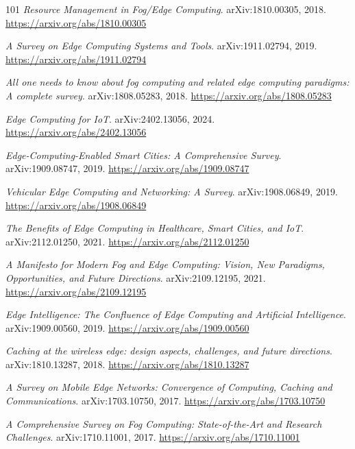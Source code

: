 \documentclass[11pt,a4paper]{article}
\begin{document}
\begin{thebibliography}{101}
\newblock \emph{Resource Management in Fog/Edge Computing}.
\newblock arXiv:1810.00305, 2018.
\newblock \url{https://arxiv.org/abs/1810.00305}

\newblock \emph{A Survey on Edge Computing Systems and Tools}.
\newblock arXiv:1911.02794, 2019.
\newblock \url{https://arxiv.org/abs/1911.02794}

\newblock \emph{All one needs to know about fog computing and related edge computing paradigms: A complete survey}.
\newblock arXiv:1808.05283, 2018.
\newblock \url{https://arxiv.org/abs/1808.05283}

\newblock \emph{Edge Computing for IoT}.
\newblock arXiv:2402.13056, 2024.
\newblock \url{https://arxiv.org/abs/2402.13056}

\newblock \emph{Edge-Computing-Enabled Smart Cities: A Comprehensive Survey}.
\newblock arXiv:1909.08747, 2019.
\newblock \url{https://arxiv.org/abs/1909.08747}

\newblock \emph{Vehicular Edge Computing and Networking: A Survey}.
\newblock arXiv:1908.06849, 2019.
\newblock \url{https://arxiv.org/abs/1908.06849}

\newblock \emph{The Benefits of Edge Computing in Healthcare, Smart Cities, and IoT}.
\newblock arXiv:2112.01250, 2021.
\newblock \url{https://arxiv.org/abs/2112.01250}

\newblock \emph{A Manifesto for Modern Fog and Edge Computing: Vision, New Paradigms, Opportunities, and Future Directions}.
\newblock arXiv:2109.12195, 2021.
\newblock \url{https://arxiv.org/abs/2109.12195}

\newblock \emph{Edge Intelligence: The Confluence of Edge Computing and Artificial Intelligence}.
\newblock arXiv:1909.00560, 2019.
\newblock \url{https://arxiv.org/abs/1909.00560}

\newblock \emph{Caching at the wireless edge: design aspects, challenges, and future directions}.
\newblock arXiv:1810.13287, 2018.
\newblock \url{https://arxiv.org/abs/1810.13287}

\newblock \emph{A Survey on Mobile Edge Networks: Convergence of Computing, Caching and Communications}.
\newblock arXiv:1703.10750, 2017.
\newblock \url{https://arxiv.org/abs/1703.10750}

\newblock \emph{A Comprehensive Survey on Fog Computing: State-of-the-Art and Research Challenges}.
\newblock arXiv:1710.11001, 2017.
\newblock \url{https://arxiv.org/abs/1710.11001}


\end{thebibliography}
\end{document}
